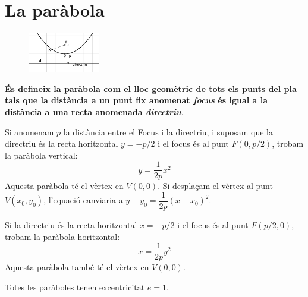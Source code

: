 \section{La paràbola}

\begin{theorybox}
	 \begin{figure} 
		\vspace{-0.5cm}
		\begin{center}
			\includegraphics[width=0.28\textwidth]{img-10/parab2}
			\vspace{-1cm}
		\end{center}
	\end{figure}
	\textbf{És defineix la paràbola com el lloc geomètric de tots els punts del pla
	tals que la distància a un punt fix anomenat \textit{focus} és igual a la distància a una recta anomenada \textit{directriu}}.
	
	Si anomenam $p$ la distància entre el Focus i la directriu, i suposam que la directriu és la recta horitzontal $y=-p/2$ i el focus és al punt $F(0, p/2)$, trobam la paràbola vertical:
	 \begin{equation}
	\label{eq:parabola-v}
	y=\frac{1}{2p}x^2
	\end{equation} 
	Aquesta paràbola té el vèrtex en $V(0,0)$. Si desplaçam el vèrtex al punt $V(x_0,y_0)$, l'equació canviaria a $y-y_0=\dfrac{1}{2p}(x-x_0)^2$.
	
	Si la directriu és la recta horitzontal $x=-p/2$ i el focus és al punt $F(p/2, 0)$, trobam la paràbola horitzontal:
	\begin{equation}
	\label{eq:parabola-h}
	x = \frac{1}{2p}y^2
	\end{equation} 
	Aquesta paràbola també té el vèrtex en $V(0,0)$.
	 
 	Totes les paràboles tenen excentricitat $e=1$.
	 
\end{theorybox}


